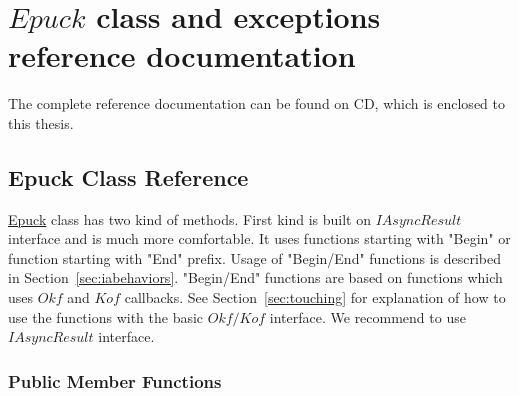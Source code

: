 \chapter{$Epuck$ class and exceptions reference documentation} \label{app:epuckref}
\begin{remark}
The complete reference documentation can be found on CD, which is enclosed
to this thesis.
\end{remark}
\hypertarget{class_elib_1_1_epuck}{
\section{Epuck Class Reference}
\label{class_elib_1_1_epuck}
}
\hyperlink{class_elib_1_1_epuck}{Epuck} class has two kind of methods.
First kind is built on $IAsyncResult$ interface and is much more comfortable.
It uses functions starting with "Begin" or function starting with "End" prefix.
Usage of "Begin/End" functions is described in Section~\ref{sec:iabehaviors}.
"Begin/End" functions are based on functions which uses $Okf$ and $Kof$ callbacks.
See Section~\ref{sec:touching} for explanation of how to use the functions with
the basic $Okf/Kof$ interface.
We recommend to use $IAsyncResult$ interface.

\subsection*{Public Member Functions}

